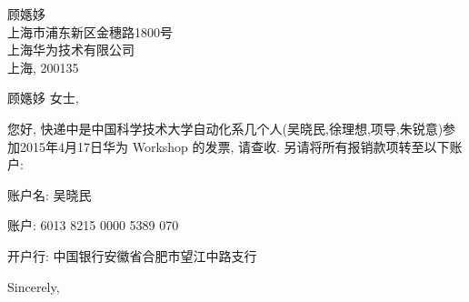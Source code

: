 \documentclass[11pt,a4paper]{letter}
\begin{document}
\begin{letter}
{顾嫕姼\\
上海市浦东新区金穗路1800号\\
上海华为技术有限公司\\
上海, 200135}

\opening{顾嫕姼 女士,}
\thispagestyle{fancy}

您好, 快递中是中国科学技术大学自动化系几个人(吴晓民,徐理想,项导,朱锐意)参加2015年4月17日华为 Workshop 的发票, 请查收. 另请将所有报销款项转至以下账户:

账户名: 吴晓民

账户: 6013 8215 0000 5389 070

开户行: 中国银行安徽省合肥市望江中路支行


\closing{Sincerely,}
\bigskip


\vfill
\end{letter}
\vfill
\end{document}
